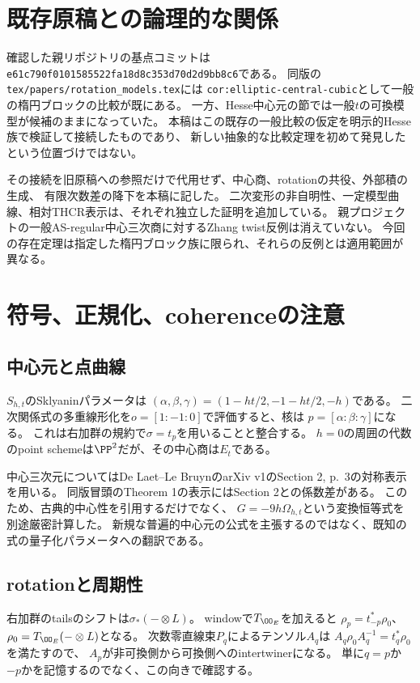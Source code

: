\section{既存原稿との論理的な関係}
確認した親リポジトリの基点コミットは
\texttt{e61c790f0101585522fa18d8c353d70d2d9bb8c6}である。
同版の\texttt{tex/papers/rotation\_models.tex}には
\texttt{cor:elliptic-central-cubic}として一般の楕円ブロックの比較が既にある。
一方、Hesse中心元の節では一般$t$の可換模型が候補のままになっていた。
本稿はこの既存の一般比較の仮定を明示的Hesse族で検証して接続したものであり、
新しい抽象的な比較定理を初めて発見したという位置づけではない。

その接続を旧原稿への参照だけで代用せず、中心商、rotationの共役、外部積の生成、
有限次数差の降下を本稿に記した。
二次変形の非自明性、一定模型曲線、相対THCR表示は、それぞれ独立した証明を追加している。
親プロジェクトの一般AS-regular中心三次商に対するZhang twist反例は消えていない。
今回の存在定理は指定した楕円ブロック族に限られ、それらの反例とは適用範囲が異なる。

\section{符号、正規化、coherenceの注意}
\subsection{中心元と点曲線}
$S_{h,t}$のSklyaninパラメータは
$(\alpha,\beta,\gamma)=(1-ht/2,-1-ht/2,-h)$である。
二次関係式の多重線形化を$o=[1:-1:0]$で評価すると、核は
$p=[\alpha:\beta:\gamma]$になる。
これは右加群の規約で$\sigma=t_p$を用いることと整合する。
$h=0$の周囲の代数のpoint schemeは$\PP^2$だが、その中心商は$E_t$である。

中心三次元についてはDe Laet--Le BruynのarXiv v1のSection 2, p.~3の対称表示を用いる。
同版冒頭のTheorem 1の表示にはSection 2との係数差がある。
このため、古典的中心性を引用するだけでなく、
$G=-9h\Omega_{h,t}$という変換恒等式を別途厳密計算した。
新規な普遍的中心元の公式を主張するのではなく、既知の式の量子化パラメータへの翻訳である。

\subsection{rotationと周期性}
右加群のtailsのシフトは$\sigma_*(-\otimes L)$。
windowで$T_{\OO_E}$を加えると
$\rho_p=t_{-p}^*\rho_0$、$\rho_0=T_{\OO_E}(-\otimes L)$となる。
次数零直線束$P_q$によるテンソル$A_q$は
$A_q\rho_0A_q^{-1}=t_q^*\rho_0$を満たすので、
$A_p$が非可換側から可換側へのintertwinerになる。
単に$q=p$か$-p$かを記憶するのでなく、この向きで確認する。

